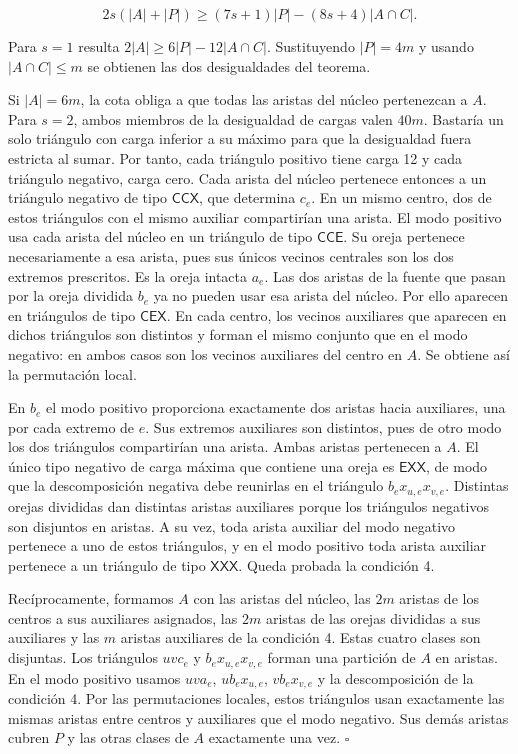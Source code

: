 \documentclass[spanish,11pt,a4paper]{article}
\begin{document}
\[
2s(|A|+|P|)\ge (7s+1)|P|-(8s+4)|A\cap C|.
\]

Para \(s=1\) resulta \(2|A|\ge 6|P|-12|A\cap C|\). Sustituyendo \(|P|=4m\) y usando \(|A\cap C|\le m\) se obtienen las dos desigualdades del teorema.

Si \(|A|=6m\), la cota obliga a que todas las aristas del núcleo pertenezcan a \(A\). Para \(s=2\), ambos miembros de la desigualdad de cargas valen \(40m\). Bastaría un solo triángulo con carga inferior a su máximo para que la desigualdad fuera estricta al sumar. Por tanto, cada triángulo positivo tiene carga 12 y cada triángulo negativo, carga cero. Cada arista del núcleo pertenece entonces a un triángulo negativo de tipo \(\mathsf{CCX}\), que determina \(c_e\). En un mismo centro, dos de estos triángulos con el mismo auxiliar compartirían una arista. El modo positivo usa cada arista del núcleo en un triángulo de tipo \(\mathsf{CCE}\). Su oreja pertenece necesariamente a esa arista, pues sus únicos vecinos centrales son los dos extremos prescritos. Es la oreja intacta \(a_e\). Las dos aristas de la fuente que pasan por la oreja dividida \(b_e\) ya no pueden usar esa arista del núcleo. Por ello aparecen en triángulos de tipo \(\mathsf{CEX}\). En cada centro, los vecinos auxiliares que aparecen en dichos triángulos son distintos y forman el mismo conjunto que en el modo negativo: en ambos casos son los vecinos auxiliares del centro en \(A\). Se obtiene así la permutación local.

En \(b_e\) el modo positivo proporciona exactamente dos aristas hacia auxiliares, una por cada extremo de \(e\). Sus extremos auxiliares son distintos, pues de otro modo los dos triángulos compartirían una arista. Ambas aristas pertenecen a \(A\). El único tipo negativo de carga máxima que contiene una oreja es \(\mathsf{EXX}\), de modo que la descomposición negativa debe reunirlas en el triángulo \(b_ex_{u,e}x_{v,e}\). Distintas orejas divididas dan distintas aristas auxiliares porque los triángulos negativos son disjuntos en aristas. A su vez, toda arista auxiliar del modo negativo pertenece a uno de estos triángulos, y en el modo positivo toda arista auxiliar pertenece a un triángulo de tipo \(\mathsf{XXX}\). Queda probada la condición 4.

Recíprocamente, formamos \(A\) con las aristas del núcleo, las \(2m\) aristas de los centros a sus auxiliares asignados, las \(2m\) aristas de las orejas divididas a sus auxiliares y las \(m\) aristas auxiliares de la condición 4. Estas cuatro clases son disjuntas. Los triángulos \(uvc_e\) y \(b_ex_{u,e}x_{v,e}\) forman una partición de \(A\) en aristas. En el modo positivo usamos \(uva_e\), \(ub_ex_{u,e}\), \(vb_ex_{v,e}\) y la descomposición de la condición 4. Por las permutaciones locales, estos triángulos usan exactamente las mismas aristas entre centros y auxiliares que el modo negativo. Sus demás aristas cubren \(P\) y las otras clases de \(A\) exactamente una vez. \(\square\)
\end{document}
